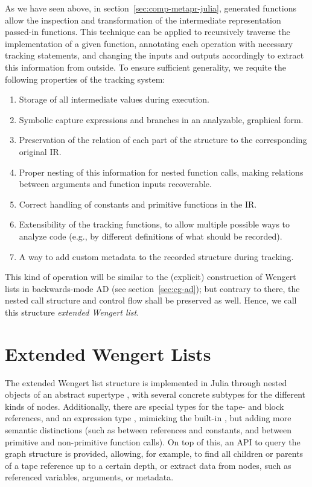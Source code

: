 As we have seen above, in section~\ref{sec:comp-metapr-julia}, generated functions allow the
inspection and transformation of the intermediate representation passed-in functions.  This
technique can be applied to recursively traverse the implementation of a given function, annotating
each operation with necessary tracking statements, and changing the inputs and outputs accordingly to
extract this information from outside.  To ensure sufficient generality, we requite the following
properties of the tracking system:
\begin{enumerate}
  \firmlist
\item Storage of all intermediate values during execution.
\item Symbolic capture expressions and branches in an analyzable, graphical form.
\item Preservation of the relation of each part of the structure to the corresponding original IR.
\item Proper nesting of this information for nested function calls, making relations between
  arguments and function inputs recoverable.
\item Correct handling of constants and primitive functions in the IR.
\item Extensibility of the tracking functions, to allow multiple possible ways to analyze code
  (e.g., by different definitions of what should be recorded).
\item A way to add custom metadata to the recorded structure during tracking.
\end{enumerate}
This kind of operation will be similar to the (explicit) construction of Wengert lists in
backwards-mode AD (see section~\ref{sec:cg-ad}); but contrary to there, the nested call structure
and control flow shall be preserved as well.  Hence, we call this structure \emph{extended Wengert
  list}.  

\section{Extended Wengert Lists}
\label{sec:exteded-wengert-lists}

The extended Wengert list structure is implemented in Julia through nested objects of an abstract
supertype , with several concrete subtypes for the different kinds of nodes.
Additionally, there are special types for the tape- and block references, and an expression type
, mimicking the built-in , but adding more semantic distinctions
(such as between references and constants, and between primitive and non-primitive function calls).
On top of this, an API to query the graph structure is provided, allowing, for example, to find all
children or parents of a tape reference up to a certain depth, or extract data from nodes, such as
referenced variables, arguments, or metadata.

